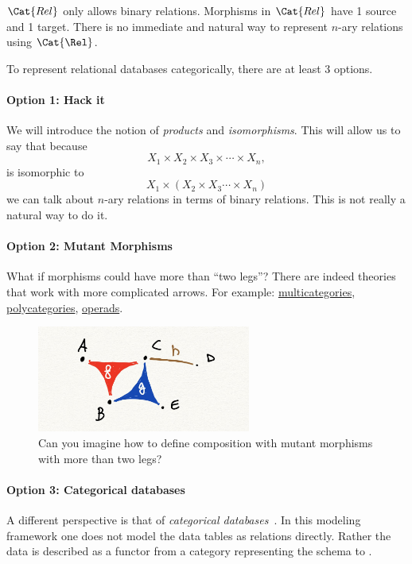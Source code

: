 $\Cat{Rel}$ only allows binary relations. Morphisms in $\Cat{Rel}$ have 1 source and 1 target. There is no immediate and natural way to represent $n$-ary relations using $\Cat{\Rel}$.

To represent relational databases categorically, there are at least 3 options.

\paragraph{Option 1: Hack it}
 We will introduce the notion of \emph{products} and \emph{isomorphisms}.
    This will allow us to say that because
    \begin{equation*}
    X_1 \times X_2 \times X_3 \times \cdots \times X_n,
    \end{equation*}
    is isomorphic to
    \begin{equation*}
    X_1 \times ( X_2 \times X_3 \cdots \times X_n)
    \end{equation*}
    we can talk about $n$-ary relations in terms of binary relations.
    This is not really a natural way to do it.

\paragraph{Option 2: Mutant Morphisms}
    What if morphisms could have more than ``two legs''? There
    are indeed theories that work with more complicated arrows.
    For example: \href{https://ncatlab.org/nlab/show/multicategory}{multicategories}, \href{https://ncatlab.org/nlab/show/polycategory}{polycategories}, \href{https://ncatlab.org/nlab/show/operad}{operads}.

\begin{figure}[h]
\centering
\includegraphics[width=7cm]{chapters/mutants.jpg}
\caption{Can you imagine how to define
composition with mutant morphisms
with more than two legs?}
\end{figure}

\paragraph{Option 3: Categorical databases}

A different perspective is that of \emph{categorical databases}~\cite{spivak2019categorical}. In this modeling framework
one does not model the data tables as relations directly.
Rather the data is described as a functor
from a category representing the schema
to \Set.
